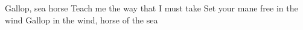   \begin{translation}
    Gallop, sea horse
    Teach me the way that I must take
    Set your mane free in the wind
    Gallop in the wind, horse of the sea
  \end{translation}
  \vfill
  \noendsongvfill
\]\]\]\]\]\]\]\]\]\]\]\]\]\]\]\]\]\]\]\]\]\]\]\]\]\]\]\]\]\]\]\]\]\]\]\]\]\]\]\]\]\]\]\]\]\]\]\]\]\]\]\]\]\]\]\]\]\]\]\]\]\]\]\]\]\]\]\]\]\]\]\]\]\]\]\]\]\]\]\]\]\]\]\]\]\]\]\]\]\]\]\]\]\]\]\]\]\]\]\]\]\]\]\]\]\]\]\]\]\]\]\]\]\]\]\]\]\]\]\]\]\]\]\]\]\]\]\]\]\]\]\]\]\]\]\]\]\]\]\]\]\]\]\]\]\]\]\]\]\]\]\]\]\]\]\]\]\]\]\]\]\]\]\]\]\]\]\]\]\]\]\]\]\]\]\]\]\]\]\]\]\]\]\]\]\]\]\]\]\]\]\]\]\]\]\]\]\]\]\]\]\]\]\]\]\]\]\]\]\]\]\]\]\]\]\]\]\]\]\]\]\]\]\]\]\]\]\]\]\]\]\]\]\]\]\]\]\]\]\]\]\]\]\]\]\]\]\]\]\]\]\]\]\]\]\]\]\]\]\]\]\]\]\]\]\]\]\]\]\]\]\]\]\]\]\]\]\]\]\]\]\]\]\]\]\]\]\]\]\]\]\]\]\]\]\]\]\]\]\]\]\]\]\]\]\]\]\]\]\]\]\]\]\]\]\]\]\]\]\]\]\]\]\]\]\]\]\]\]\]\]\]\]\]\]\]\]\]\]\]\]\]\]\]\]\]\]\]\]\]\]\]\]\]\]\]\]\]\]\]\]\]\]\]\]\]\]\]\]\]\]\]\]\]\]\]\]\]\]\]\]\]\]\]\]\]\]\]\]\]\]\]\]\]\]\]\]\]\]\]\]\]\]\]\]\]\]\]\]\]\]\]\]\]\]\]\]\]\]\]\]\]\]\]\]\]\]\]\]\]\]\]\]\]\]\]\]\]\]\]\]\]\]\]\]\]\]\]\]\]\]\]\]\]\]\]\]\]\]\]\]\]\]\]\]\]\]\]\]\]\]\]\]\]\]\]\]\]\]\]\]\]\]\]\]\]\]\]\]\]\]\]\]\]\]\]\]\]\]\]\]\]\]\]\]\]\]\]\]\]\]\]\]\]\]\]\]\]\]\]\]\]\]\]\]\]\]\]\]\]\]\]\]\]\]\]\]\]\]\]\]\]\]\]\]\]\]\]\]\]\]\]\]\]\]\]\]\]\]\]\]\]\]\]\]\]\]\]\]\]\]\]\]\]\]\]\]\]\]\]\]\]\]\]\]\]\]\]\]\]\]\]\]\]\]\]\]\]\]\]\]\]\]\]\]\]\]\]\]\]\]\]\]\]\]\]\]\]\]\]\]\]\]\]\]\]\]\]\]\]\]\]\]\]\]\]\]\]\]\]\]\]\]\]\]\]\]\]\]\]\]\]\]\]\]\]\]\]\]\]\]\]\]\]\]\]\]\]\]\]\]\]\]\]\]\]\]\]\]\]\]\]\]\]\]\]\]\]\]\]\]\]\]\]\]\]\]\]\]\]\]\]\]\]\]\]\]\]\]\]\]\]\]\]\]\]\]\]\]\]\]\]\]\]\]\]\]\]\]\]\]\]\]\]\]\]\]\]\]\]\]\]\]\]\]\]\]\]\]\]\]\]\]\]\]\]\]\]\]\]\]\]\]\]\]\]\]\]\]\]\]\]\]\]\]\]\]\]\]\]\]\]\]\]\]\]\]\]\]\]\]\]\]\]\]\]\]\]\]\]\]\]\]\]\]\]\]\]\]\]\]\]\]\]\]\]\]\]\]\]\]\]\]\]\]\]\]\]\]\]\]\]\]\]\]\]\]\]\]\]\]\]\]\]\]\]\]\]\]\]\]\]\]\]\]\]\]\]\]\]\]\]\]\]\]\]\]\]\]\]\]\]\]\]\]\]\]\]\]\]\]\]\]\]\]\]\]\]\]\]\]\]\]\]\]\]\]\]\]\]\]\]\]\]\]\]\]\]\]\]\]\]\]\]\]\]\]\]\]\]\]\]\]\]\]\]\]\]\]\]\]\]\]\]\]\]\]\]\]\]\]\]\]\]\]\]\]\]\]\]\]\]\]\]\]\]\]\]\]\]\]\]\]\]\]\]\]\]\]\]\]\]\]\]\]\]\]\]\]\]\]\]\]\]\]\]\]\]\]\]\]\]\]\]\]\]\]\]\]\]\]\]\]\]\]\]\]\]\]\]\]\]\]\]\]\]\]\]\]\]\]\]\]\]\]\]\]\]\]\]\]\]\]\]\]\]\]\]\]\]\]\]\]\]\]\]\]\]\]\]\]\]\]\]\]\]\]\]\]\]\]\]\]\]\]\]\]\]\]\]\]\]\]\]\]\]\]\]\]\]\]\]\]\]\]\]\]\]\]\]\]\]\]\]\]\]\]\]\]\]\]\]\]\]\]\]\]\]\]\]\]\]\]\]\]\]\]\]\]\]\]\]\]\]\]\]\]\]\]\]\]\]\]\]\]\]\]\]\]\]\]\]\]\]\]\]\]\]\]\]\]\]\]\]\]\]\]\]\]\]\]\]\]\]\]\]\]\]\]\]\]\]\]\]\]\]\]\]\]\]\]\]\]\]\]\]\]\]\]\]\]\]\]\]\]\]\]\]\]\]\]\]\]\]\]\]\]\]\]\]\]\]\]\]\]\]\]\]\]\]\]\]\]\]\]\]\]\]

